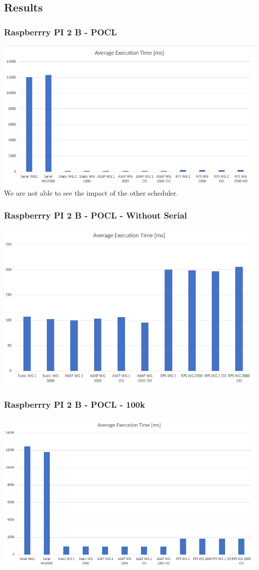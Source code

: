 \documentclass{beamer}
\begin{document}
\subsection{Results}
\begin{frame}
   \frametitle{Raspberrry PI 2 B - POCL}
   \includegraphics[width=.8\textwidth]{res/ResultsPOCL.PNG}\\
   We are not able to see the impact of the other scheduler.
\end{frame}
\begin{frame}
	\frametitle{Raspberrry PI 2 B - POCL - Without Serial}
	\includegraphics[width=.8\textwidth]{res/ResultsPOCL_WithoutSerial.PNG}
\end{frame}
\begin{frame}
	\frametitle{Raspberrry PI 2 B - POCL - 100k}
	\includegraphics[width=.8\textwidth]{res/ResultsPOCL-100k.PNG}
\end{frame}
\end{document}
